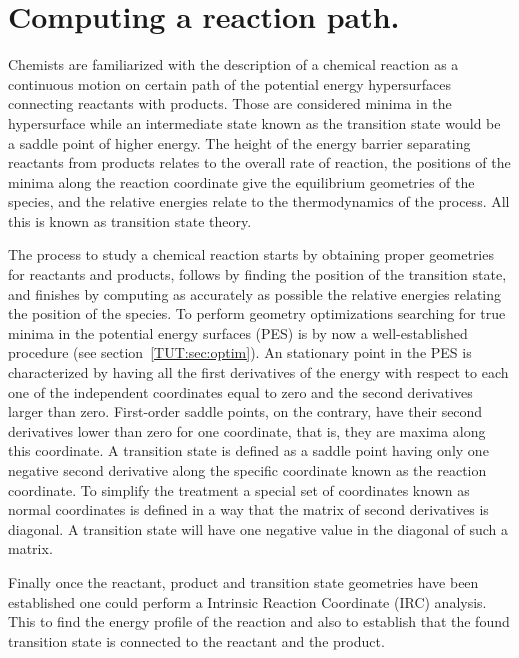 \section{Computing a reaction path.}
\label{TUT:sec:path}

Chemists are familiarized with the description of a chemical
reaction as a continuous motion on certain path of the 
potential energy hypersurfaces connecting reactants with 
products. Those are considered minima in the hypersurface
while an intermediate state known as the transition state
would be a saddle point of higher energy. The height of the
energy barrier separating reactants from products relates
to the overall rate of reaction, the positions of the
minima along the reaction coordinate give the equilibrium
geometries of the species, and the relative energies relate
to the thermodynamics of the process. All this is known
as transition state theory.

The process to study a chemical reaction starts by obtaining
proper geometries for reactants and products, follows by finding the
position of the transition state, and finishes by computing 
as accurately as possible the relative energies relating the
position of the species. To perform geometry optimizations
searching for true minima in the potential energy surfaces (PES)
is by now a well-established procedure (see section~\ref{TUT:sec:optim}).
An stationary point in the PES is characterized by having all the
first derivatives of the energy with respect to each one of the
independent coordinates equal to zero and the second derivatives
larger than zero. First-order saddle points, on the contrary, have their
second derivatives lower than zero for one coordinate,
that is, they are maxima along this coordinate. A
transition state is defined as a saddle point having only
one negative second derivative along the specific coordinate
known as the reaction coordinate. To simplify the treatment a special
set of coordinates known as normal coordinates is defined
in a way that the matrix of second derivatives is diagonal.
A transition state will have one negative value in the
diagonal of such a matrix.

Finally once the reactant, product and transition state geometries have been established one
could perform a Intrinsic Reaction Coordinate (IRC) analysis. This to find the energy profile
of the reaction and also to establish that the found transition state is connected to the
reactant and the product.

